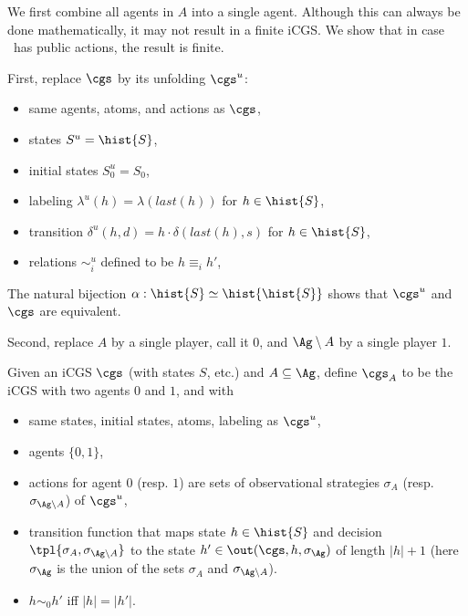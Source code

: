 We first combine all agents in $A$ into a single agent. Although this can always be done mathematically, it may not result in a finite iCGS. We show that in case \cgs\
has public actions, the result is finite.

First, replace $\cgs$ by its unfolding $\cgs^u$:
\begin{itemize}
 \item same agents, atoms, and actions as $\cgs$,
 \item states $S^u = \hist{S}$,
 \item initial states $S_0^u = S_0$,
 \item labeling $\lambda^u(h) = \lambda(last(h))$ for $h \in \hist{S}$,
 \item transition $\delta^u(h,d) = h \cdot \delta(last(h),s)$  for $h \in \hist{S}$,
 \item relations $\sim^u_i$ defined to be $h \equiv_i h'$,
\end{itemize}

The natural bijection $\alpha:\hist{S} \simeq \hist{\hist{S}}$ shows that $\cgs^u$ and $\cgs$ are equivalent. 




Second, replace $A$ by a single player, call it $0$, and $\Ag \setminus A$ by a single player $1$.

\begin{definition}
 Given an iCGS $\cgs$ (with states $S$, etc.) and $A \subseteq \Ag$, define $\cgs_A$ to be the iCGS with two agents $0$ and $1$, and with
 \begin{itemize}
  \item same states, initial states, atoms, labeling as $\cgs^u$,
  \item agents $\{0,1\}$,
  \item actions for agent $0$ (resp. $1$) are sets of observational strategies $\sigma_A$ (resp. $\sigma_{\Ag \setminus A}$) of $\cgs^u$,
  \item transition function that maps state $h \in \hist{S}$ and decision $\tpl{\sigma_A,\sigma_{\Ag \setminus A}}$ to the state $h' \in \out(\cgs,h,\sigma_\Ag)$ of length $|h|+1$ (here $\sigma_\Ag$ is the union of the sets $\sigma_A$ and $\sigma_{\Ag \setminus A}$).
  \item $h \sim_0 h'$ iff $|h| = |h'|$. \todo{???}
 \end{itemize}

\end{definition}

